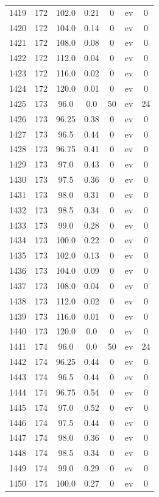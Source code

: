 \documentclass[12pt,a4paper]{article}
\begin{document}
\begin{tabular}{r|cccccc}
	1419 & 172 & 102.0 & 0.21 & 0 & ev & 0 \\
	1420 & 172 & 104.0 & 0.14 & 0 & ev & 0 \\
	1421 & 172 & 108.0 & 0.08 & 0 & ev & 0 \\
	1422 & 172 & 112.0 & 0.04 & 0 & ev & 0 \\
	1423 & 172 & 116.0 & 0.02 & 0 & ev & 0 \\
	1424 & 172 & 120.0 & 0.01 & 0 & ev & 0 \\
	1425 & 173 & 96.0 & 0.0 & 50 & ev & 24 \\
	1426 & 173 & 96.25 & 0.38 & 0 & ev & 0 \\
	1427 & 173 & 96.5 & 0.44 & 0 & ev & 0 \\
	1428 & 173 & 96.75 & 0.41 & 0 & ev & 0 \\
	1429 & 173 & 97.0 & 0.43 & 0 & ev & 0 \\
	1430 & 173 & 97.5 & 0.36 & 0 & ev & 0 \\
	1431 & 173 & 98.0 & 0.31 & 0 & ev & 0 \\
	1432 & 173 & 98.5 & 0.34 & 0 & ev & 0 \\
	1433 & 173 & 99.0 & 0.28 & 0 & ev & 0 \\
	1434 & 173 & 100.0 & 0.22 & 0 & ev & 0 \\
	1435 & 173 & 102.0 & 0.13 & 0 & ev & 0 \\
	1436 & 173 & 104.0 & 0.09 & 0 & ev & 0 \\
	1437 & 173 & 108.0 & 0.04 & 0 & ev & 0 \\
	1438 & 173 & 112.0 & 0.02 & 0 & ev & 0 \\
	1439 & 173 & 116.0 & 0.01 & 0 & ev & 0 \\
	1440 & 173 & 120.0 & 0.0 & 0 & ev & 0 \\
	1441 & 174 & 96.0 & 0.0 & 50 & ev & 24 \\
	1442 & 174 & 96.25 & 0.44 & 0 & ev & 0 \\
	1443 & 174 & 96.5 & 0.44 & 0 & ev & 0 \\
	1444 & 174 & 96.75 & 0.54 & 0 & ev & 0 \\
	1445 & 174 & 97.0 & 0.52 & 0 & ev & 0 \\
	1446 & 174 & 97.5 & 0.44 & 0 & ev & 0 \\
	1447 & 174 & 98.0 & 0.36 & 0 & ev & 0 \\
	1448 & 174 & 98.5 & 0.34 & 0 & ev & 0 \\
	1449 & 174 & 99.0 & 0.29 & 0 & ev & 0 \\
	1450 & 174 & 100.0 & 0.27 & 0 & ev & 0 \\

\end{tabular}
\end{document}
